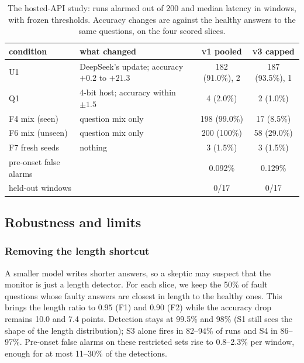 \documentclass{article}
\newcommand{\vone}{\textsc{v1}}
\newcommand{\vthree}{\textsc{v3}}
\begin{document}
\begin{table}[t]
  \centering\small
  \caption{The hosted-API study: runs alarmed out of 200 and median latency in
  windows, with frozen thresholds. Accuracy changes are against the healthy answers
  to the same questions, on the four scored slices.}
  \label{tab:api}
  \setlength{\tabcolsep}{5pt}
  \begin{tabular}{llcc}
    \toprule
    condition & what changed & \vone{} pooled & \vthree{} capped \\
    \midrule
    U1 & DeepSeek's update; accuracy $+0.2$ to $+21.3$ & 182 (91.0\%), 2 & 187 (93.5\%), 1 \\
    Q1 & 4-bit host; accuracy within $\pm1.5$ & 4 (2.0\%) & 2 (1.0\%) \\
    \midrule
    F4 mix (seen) & question mix only & 198 (99.0\%) & 17 (8.5\%) \\
    F6 mix (unseen) & question mix only & 200 (100\%) & 58 (29.0\%) \\
    F7 fresh seeds & nothing & 3 (1.5\%) & 3 (1.5\%) \\
    \midrule
    pre-onset false alarms & & 0.092\% & 0.129\% \\
    held-out windows & & 0/17 & 0/17 \\
    \bottomrule
  \end{tabular}
\end{table}

\subsection{Robustness and limits}
\label{sec:robust}

\subsubsection{Removing the length shortcut}
\label{sec:lengthmatched}
A smaller model writes shorter answers, so a skeptic may suspect that the monitor
is just a length detector. For each slice, we keep the 50\% of fault questions
whose faulty answers are closest in length to the healthy ones. This brings the
length ratio to $0.95$ (F1) and $0.90$ (F2) while the accuracy drop remains
10.0 and 7.4 points. Detection stays at 99.5\% and 98\% (S1 still sees the shape of the length
distribution); S3 alone fires in 82--94\% of runs and S4 in 86--97\%. Pre-onset
false alarms on these restricted sets rise to 0.8--2.3\% per window, enough for
at most 11--30\% of the detections.
\end{document}
